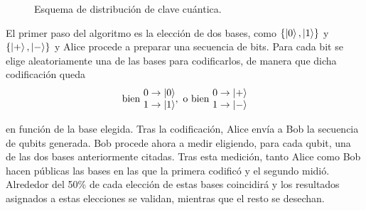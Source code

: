 \begin{figure}[!htb]
\begin{center}
\end{center}
\caption{Esquema de distribución de clave cuántica.}
\label{fig:fig21}
\end{figure}

El primer paso del algoritmo es la elección de dos bases, como $\{\left|0\right\rangle,\left|1\right\rangle\}$ y $\{\left|+\right\rangle,\left|-\right\rangle\}$ y Alice procede a preparar una secuencia de bits. Para cada bit se elige aleatoriamente una de las bases para codificarlos, de manera que dicha codificación queda
\[\mathrm{bien\ }\begin{matrix}0\to\ket0\\1\to\ket1\end{matrix}\mathrm{,\ o\ bien\ }\begin{matrix}0\to\ket+\\1\to\ket-\end{matrix}\] 

en función de la base elegida. Tras la codificación, Alice envía a Bob la secuencia de qubits generada. Bob procede ahora a medir eligiendo, para cada qubit, una de las dos bases anteriormente citadas. Tras esta medición, tanto Alice como Bob hacen públicas las bases en las que la primera codificó y el segundo midió. Alrededor del 50\% de cada elección de estas bases coincidirá y los resultados asignados a estas elecciones se validan, mientras que el resto se desechan.


